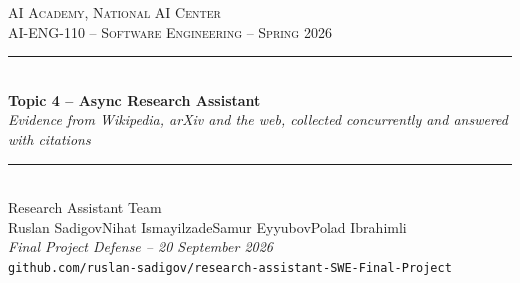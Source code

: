 \documentclass[aspectratio=169,11pt]{beamer}
\newcommand{\teamname}{Research Assistant Team}
\newcommand{\topicchoice}{Topic 4 -- Async Research Assistant}
\newcommand{\memberone}{Ruslan Sadigov}
\newcommand{\membertwo}{Nihat Ismayilzade}
\newcommand{\memberthree}{Samur Eyyubov}
\newcommand{\memberfour}{Polad Ibrahimli}
\newcommand{\repolink}{github.com/ruslan-sadigov/research-assistant-SWE-Final-Project}
\newcommand{\defensedate}{20 September 2026}
\newcommand{\coursecode}{AI-ENG-110}
\newcommand{\coursename}{Software Engineering}
\newcommand{\institution}{AI Academy, National AI Center}
\newcommand{\semester}{Spring 2026}
\begin{document}
{%
\begin{frame}[plain]
  \begin{center}
    \vspace{0.5cm}
    {\small \textsc{\institution}}\\[0.2em]
    {\small \textsc{\coursecode{} -- \coursename{} -- \semester{}}}\\[1.0em]
    \rule{0.7\textwidth}{0.6pt}\\[0.4em]
    {\LARGE\bfseries\color{accent} \topicchoice}\\[0.4em]
    {\small\itshape Evidence from Wikipedia, arXiv and the web, collected concurrently
    and answered with citations}\\[0.4em]
    \rule{0.7\textwidth}{0.6pt}\\[1.0em]
    {\large \teamname}\\[0.5em]
    {\normalsize \memberone\quad\textbullet\quad\membertwo\quad\textbullet\quad\memberthree\quad\textbullet\quad\memberfour}\\[0.9cm]
    {\footnotesize\itshape Final Project Defense -- \defensedate}\\[0.4em]
    {\footnotesize\texttt{\repolink}}
  \end{center}
\end{frame}
}
\end{document}
